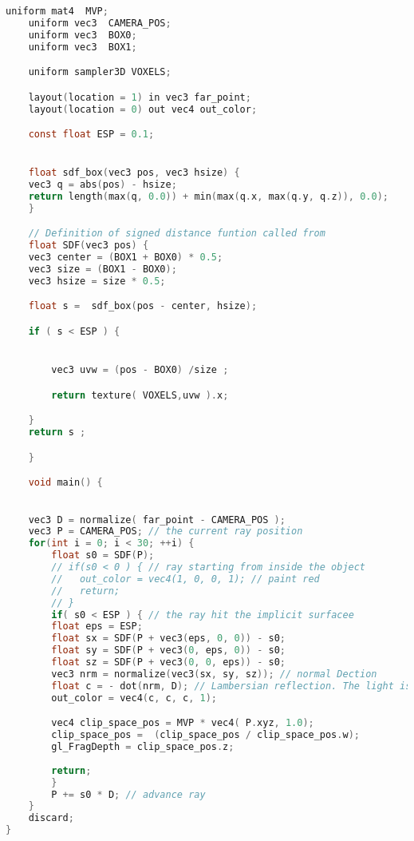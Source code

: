 \begin{appendices}
\begin{lstlisting}[language=C, caption = Fragment shader of ray-tracing SDF visualisation]
	uniform mat4  MVP;
	uniform vec3  CAMERA_POS;
	uniform vec3  BOX0;
	uniform vec3  BOX1;

	uniform sampler3D VOXELS;

	layout(location = 1) in vec3 far_point;
	layout(location = 0) out vec4 out_color;

	const float ESP = 0.1;


	float sdf_box(vec3 pos, vec3 hsize) {
	vec3 q = abs(pos) - hsize;
	return length(max(q, 0.0)) + min(max(q.x, max(q.y, q.z)), 0.0);
	}

	// Definition of signed distance funtion called from
	float SDF(vec3 pos) {
	vec3 center = (BOX1 + BOX0) * 0.5;
	vec3 size = (BOX1 - BOX0);
	vec3 hsize = size * 0.5;

	float s =  sdf_box(pos - center, hsize);

	if ( s < ESP ) {


		vec3 uvw = (pos - BOX0) /size ;

		return texture( VOXELS,uvw ).x;

	}
	return s ;

	}

	void main() {

	
	vec3 D = normalize( far_point - CAMERA_POS ); 
	vec3 P = CAMERA_POS; // the current ray position
	for(int i = 0; i < 30; ++i) {
		float s0 = SDF(P);
		// if(s0 < 0 ) { // ray starting from inside the object
		//   out_color = vec4(1, 0, 0, 1); // paint red
		//   return;
		// }
		if( s0 < ESP ) { // the ray hit the implicit surfacee
		float eps = ESP;
		float sx = SDF(P + vec3(eps, 0, 0)) - s0;
		float sy = SDF(P + vec3(0, eps, 0)) - s0;
		float sz = SDF(P + vec3(0, 0, eps)) - s0;
		vec3 nrm = normalize(vec3(sx, sy, sz)); // normal Dection
		float c = - dot(nrm, D); // Lambersian reflection. The light is at the camera position.
		out_color = vec4(c, c, c, 1);

		vec4 clip_space_pos = MVP * vec4( P.xyz, 1.0);
		clip_space_pos =  (clip_space_pos / clip_space_pos.w);
		gl_FragDepth = clip_space_pos.z;
				
		return;
		}
		P += s0 * D; // advance ray
	}
	discard;
}

\end{lstlisting}

\end{appendices}
